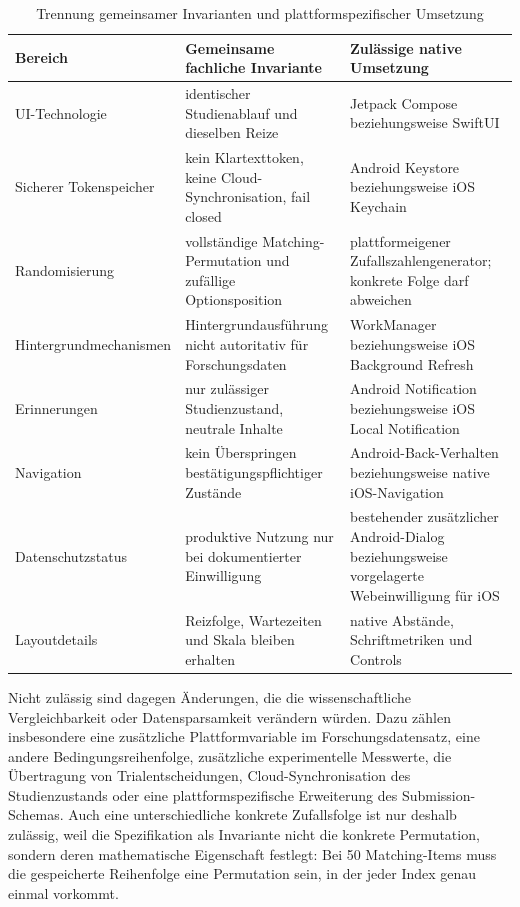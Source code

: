 \begin{neu}
\begin{table}[htbp]
\centering
\caption{Trennung gemeinsamer Invarianten und plattformspezifischer Umsetzung}
\label{tab:platform-spec-invariants}
\begin{tabular}{p{}p{}p{}}
\textbf{Bereich} & \textbf{Gemeinsame fachliche Invariante} & \textbf{Zulässige native Umsetzung} \\
\hline
UI-Technologie & identischer Studienablauf und dieselben Reize & Jetpack Compose beziehungsweise SwiftUI \\
Sicherer Tokenspeicher & kein Klartexttoken, keine Cloud-Synchronisation, fail closed & Android Keystore beziehungsweise iOS Keychain \\
Randomisierung & vollständige Matching-Permutation und zufällige Optionsposition & plattformeigener Zufallszahlengenerator; konkrete Folge darf abweichen \\
Hintergrundmechanismen & Hintergrundausführung nicht autoritativ für Forschungsdaten & WorkManager beziehungsweise iOS Background Refresh \\
Erinnerungen & nur zulässiger Studienzustand, neutrale Inhalte & Android Notification beziehungsweise iOS Local Notification \\
Navigation & kein Überspringen bestätigungspflichtiger Zustände & Android-Back-Verhalten beziehungsweise native iOS-Navigation \\
Datenschutzstatus & produktive Nutzung nur bei dokumentierter Einwilligung & bestehender zusätzlicher Android-Dialog beziehungsweise vorgelagerte Webeinwilligung für iOS \\
Layoutdetails & Reizfolge, Wartezeiten und Skala bleiben erhalten & native Abstände, Schriftmetriken und Controls \\
\end{tabular}
\end{table}

Nicht zulässig sind dagegen Änderungen, die die wissenschaftliche Vergleichbarkeit oder Datensparsamkeit verändern würden. Dazu zählen insbesondere eine zusätzliche Plattformvariable im Forschungsdatensatz, eine andere Bedingungsreihenfolge, zusätzliche experimentelle Messwerte, die Übertragung von Trialentscheidungen, Cloud-Synchronisation des Studienzustands oder eine plattformspezifische Erweiterung des Submission-Schemas. Auch eine unterschiedliche konkrete Zufallsfolge ist nur deshalb zulässig, weil die Spezifikation als Invariante nicht die konkrete Permutation, sondern deren mathematische Eigenschaft festlegt: Bei 50 Matching-Items muss die gespeicherte Reihenfolge eine Permutation sein, in der jeder Index genau einmal vorkommt.


\end{neu}
